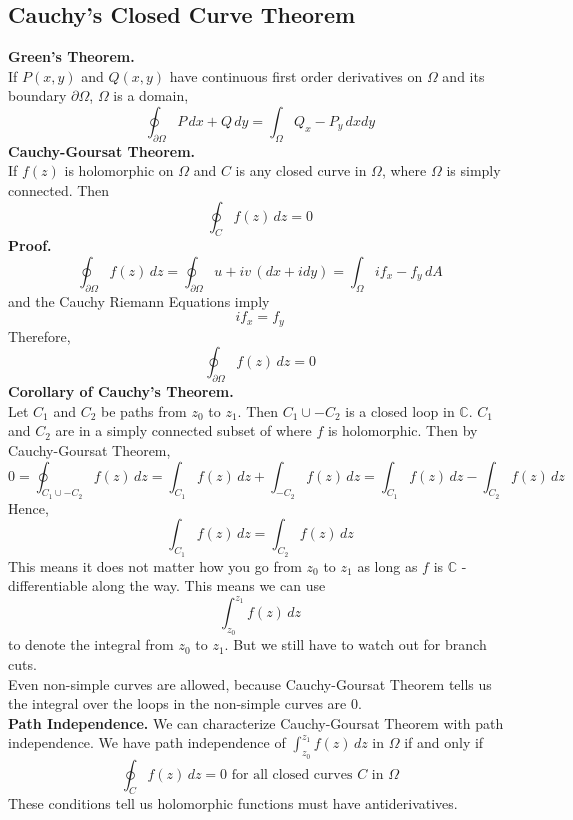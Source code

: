 \documentclass[11pt]{article}
\begin{document}
\subsection{Cauchy's Closed Curve Theorem}
\textbf{Green's Theorem.} \\
If $P(x, y)$ and $Q(x, y)$ have continuous first order derivatives on $\Omega$ and its boundary $\partial \Omega$, $\Omega$ is a domain, 
$$\oint_{\partial \Omega} P \,dx + Q \,dy = \int_\Omega Q_x - P_y \,dxdy$$
\newline
\textbf{Cauchy-Goursat Theorem.} \\
If $f(z)$ is holomorphic on $\Omega$ and $C$ is any closed curve in $\Omega$, where $\Omega$ is simply connected. Then
$$\oint_{C} f(z) \, dz = 0$$
\textbf{Proof.}
$$\oint_{\partial \Omega} f(z) \, dz = \oint_{\partial \Omega} u + iv \,{(dx + idy)} = \int_{\Omega}{if_x - f_y} \, dA$$
and the Cauchy Riemann Equations imply 
$$if_x = f_y$$
Therefore, 
$$\oint_{\partial \Omega} f(z) \, dz = 0$$
\newline
\textbf{Corollary of Cauchy's Theorem.} \\
Let $C_1$ and $C_2$ be paths from $z_0$ to $z_1$. Then $C_1 \cup -C_2$ is a closed loop in $\mathbb{C}$. $C_1$ and $C_2$ are in a simply connected subset of where $f$ is holomorphic. Then by Cauchy-Goursat Theorem, 
$$ 0 = \oint_{C_1 \cup -C_2}f(z) \,dz  = \int_{C_1}f(z) \,dz + \int_{-C_2}f(z) \,dz = \int_{C_1}f(z) \,dz - \int_{C_2}f(z) \,dz$$ 
Hence, 
$$\int_{C_1}f(z) \,dz = \int_{C_2}f(z) \,dz$$
\newline
This means it does not matter how you go from $z_0$ to $z_1$ as long as $f$ is $\mathbb{C}$ -differentiable along the way. This means we can use 
$$\int_{z_0}^{z_1}f(z)\,dz$$ 
to denote the integral from $z_0$ to $z_1$. But we still have to watch out for branch cuts. \\
Even non-simple curves are allowed, because Cauchy-Goursat Theorem tells us the integral over the loops in the non-simple curves are 0. \\
\newline
\textbf{Path Independence.} We can characterize Cauchy-Goursat Theorem with path independence. We have path independence of $\int_{z_0}^{z_1}f(z) \,dz$ in $\Omega$ if and only if 
\begin{equation*}
\oint_C f(z) \,dz = 0 \mbox{ for all closed curves } C \mbox{ in } \Omega
\end{equation*}
These conditions tell us holomorphic functions must have antiderivatives. 
\end{document}
